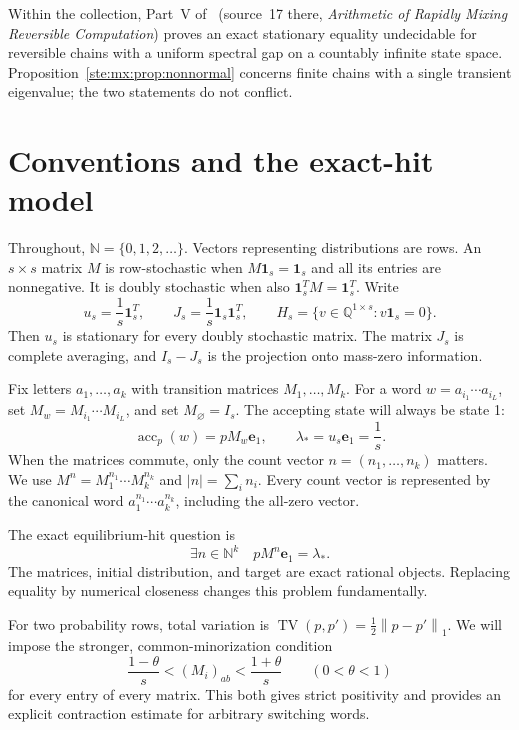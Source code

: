 \documentclass[11pt,letterpaper]{article}
\theoremstyle{definition}
\theoremstyle{remark}
\newcommand{\N}{\mathbb N}
\newcommand{\Q}{\mathbb Q}
\newcommand{\one}{\mathbf 1}
\newcommand{\TV}{\operatorname{TV}}
\newcommand{\norm}[1]{\left\lVert #1\right\rVert}
\newcommand{\e}{\mathbf e}
\newcommand{\acc}{\operatorname{acc}}
\begin{document}
Within the collection, Part~V of~\cite{pqc} (source~17 there, \emph{Arithmetic of Rapidly Mixing Reversible Computation}) proves an exact stationary equality undecidable for reversible chains with a uniform spectral gap on a countably infinite state space. Proposition~\ref{ste:mx:prop:nonnormal} concerns finite chains with a single transient eigenvalue; the two statements do not conflict.

\section{Conventions and the exact-hit model}\label{ste:mx:sec:model}

Throughout, $\N=\{0,1,2,\ldots\}$. Vectors representing distributions are rows.
An $s\times s$ matrix $M$ is row-stochastic when $M\one_s=\one_s$ and all its
entries are nonnegative. It is doubly stochastic when also
$\one_s^TM=\one_s^T$. Write
\begin{equation}\label{ste:mx:eq:uniform}
 u_s=\frac1s\one_s^T,\qquad J_s=\frac1s\one_s\one_s^T,
 \qquad H_s=\{v\in\Q^{1\times s}:v\one_s=0\}.
\end{equation}
Then $u_s$ is stationary for every doubly stochastic matrix. The matrix $J_s$
is complete averaging, and $I_s-J_s$ is the projection onto mass-zero
information.

Fix letters $a_1,\ldots,a_k$ with transition matrices $M_1,\ldots,M_k$.
For a word $w=a_{i_1}\cdots a_{i_L}$, set
$M_w=M_{i_1}\cdots M_{i_L}$, and set $M_{\varnothing}=I_s$. The accepting
state will always be state 1:
\begin{equation}\label{ste:mx:eq:accdef}
 \acc_p(w)=pM_w\e_1,\qquad \lambda_* =u_s\e_1=\frac1s.
\end{equation}
When the matrices commute, only the count vector
$n=(n_1,\ldots,n_k)$ matters. We use
$M^n=M_1^{n_1}\cdots M_k^{n_k}$ and $|n|=\sum_i n_i$.
Every count vector is represented by the canonical word
$a_1^{n_1}\cdots a_k^{n_k}$, including the all-zero vector.

The exact equilibrium-hit question is
\begin{equation}\label{ste:mx:eq:hit}
 \exists n\in\N^k\quad pM^n\e_1=\lambda_*.
\end{equation}
The matrices, initial distribution, and target are exact rational objects.
Replacing equality by numerical closeness changes this problem fundamentally.

For two probability rows, total variation is
$\TV(p,p')=\frac12\norm{p-p'}_1$. We will impose the stronger, common-minorization
condition
\begin{equation}\label{ste:mx:eq:entrymargin}
 \frac{1-\theta}{s} < (M_i)_{ab} < \frac{1+\theta}{s}
 \qquad(0<\theta<1)
\end{equation}
for every entry of every matrix. This both gives strict positivity and provides
an explicit contraction estimate for arbitrary switching words.
\end{document}
